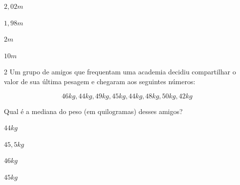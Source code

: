 \begin{multicols}{2}
\begin{escolha}[itemsep=0pt]
\item $2,02 m$
\item $1,98 m$
\item $2 m$
\item $10 m$
\end{escolha}
\end{multicols}











\num{2} Um grupo de amigos que frequentam uma academia decidiu compartilhar o
valor de sua última pesagem e chegaram aos seguintes números:

$$46kg, 44kg, 49kg, 45kg, 44kg, 48kg, 50kg, 42kg$$

Qual é a mediana do peso (em quilogramas) desses amigos?

\begin{multicols}{2}
\begin{escolha}[itemsep=0pt]
\item $44kg$
\item $45,5kg$
\item $46 kg$
\item $45kg$
\end{escolha}
\end{multicols}


